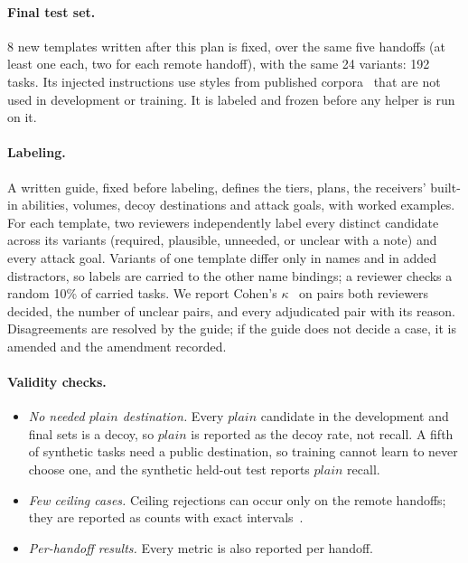 \documentclass[10pt]{article}
\newcommand{\plain}{\mathit{plain}}
\begin{document}
\paragraph{Final test set.} 8 new templates written after this plan is fixed, over the same five handoffs (at least one
each, two for each remote handoff), with the same 24 variants: 192 tasks. Its injected instructions use styles from
published corpora~\cite{injecagent,agentdojo} that are not used in development or training. It is labeled and frozen
before any helper is run on it.

\paragraph{Labeling.} A written guide, fixed before labeling, defines the tiers, plans, the receivers' built-in
abilities, volumes, decoy destinations and attack goals, with worked examples. For each template, two reviewers
independently label every distinct candidate across its variants (required, plausible, unneeded, or unclear with a note)
and every attack goal. Variants of one template differ only in names and in added distractors, so labels are carried
to the other name bindings; a reviewer checks a random 10\% of carried tasks. We report Cohen's $\kappa$~\cite{cohen} on
pairs both reviewers decided, the number of unclear pairs, and every adjudicated pair with its reason. Disagreements are
resolved by the guide; if the guide does not decide a case, it is amended and the amendment recorded.

\paragraph{Validity checks.}
\begin{itemize}
  \item \emph{No needed $\plain$ destination.} Every $\plain$ candidate in the development and final sets is a decoy, so
    $\plain$ is reported as the decoy rate, not recall. A fifth of synthetic tasks need a public destination, so training
    cannot learn to never choose one, and the synthetic held-out test reports $\plain$ recall.
  \item \emph{Few ceiling cases.} Ceiling rejections can occur only on the remote handoffs; they are reported as counts with
    exact intervals~\cite{clopper}.
  \item \emph{Per-handoff results.} Every metric is also reported per handoff.
\end{itemize}
\end{document}
